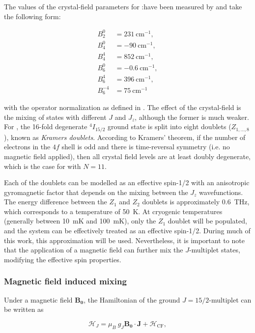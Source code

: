 The values of the crystal-field parameters for \Er:\Ca have been measured by \cite{enrique_optical_1971} and take the following form:

\begin{align*}
    B_2^0 &= 231~\text{cm}^{-1}, \\
    B_4^0 &= -90~\text{cm}^{-1}, \\
    B_4^4 &= 852~\text{cm}^{-1}, \\
    B_6^0 &= -0.6~\text{cm}^{-1}, \\
    B_6^4 &= 396~\text{cm}^{-1}, \\
    B_6^{-4} &= 75~\text{cm}^{-1}
\end{align*}

with the operator normalization as defined in \cite{erath_crystal_1961}. The effect of the crystal-field is the mixing of states with different $J$ and $J_z$, although the former is much weaker. For \Er, the 16-fold degenerate $^4I_{15/2}$ ground state is split into eight doublets ($Z_{1,\dots,8}$), known as \emph{Kramers doublets}. According to Kramers' theorem, \cite{kramers_general_1930} if the number of electrons in the $4f$ shell is odd and there is time-reversal symmetry (i.e. no magnetic field applied), then all crystal field levels are at least doubly degenerate, which is the case for \Er with $N=11$.

Each of the doublets can be modelled as an effective spin-1/2 with an anisotropic gyromagnetic factor that depends on the mixing between the $J_z$ wavefunctions. The energy difference between the $Z_1$ and $Z_2$ doublets is approximately 0.6~THz, which corresponds to a temperature of 50~K. At cryogenic temperatures (generally between 10~mK and 100~mK), only the $Z_1$ doublet will be populated, and the system can be effectively treated as an effective spin-1/2. During much of this work, this approximation will be used. Nevertheless, it is important to note that the application of a magnetic field can further mix the $J$-multiplet states, modifying the effective spin properties.

\subsubsection{Magnetic field induced mixing}

Under a magnetic field $\mathbf{B_0}$, the Hamiltonian of the ground $J=15/2$-multiplet can be written as 

\begin{equation}
    \label{eq:J-CF_Hamiltonian}
    \mathcal{H}_J = \mu_B \ g_J\mathbf{B_0}\cdot \mathbf{J} + \mathcal{H}_{\mathrm{CF}},
\end{equation}

